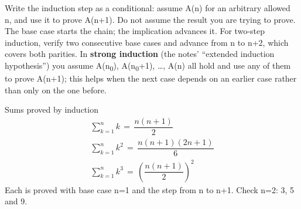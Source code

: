 \documentclass[11pt]{article}
\begin{document}
\begin{keepsection}
\begin{center}
\begin{minipage}[t]{0.950\linewidth}\centering
{}\par{}\end{minipage}
\end{center}

Write the induction step as a conditional: assume A(n) for an arbitrary allowed n, and use it to prove A(n+1). Do not assume the result you are trying to prove. The base case starts the chain; the implication advances it. For two-step induction, verify two consecutive base cases and advance from n to n+2, which covers both parities. In \textbf{strong induction} (the notes’ “extended induction hypothesis”) you assume A(n\textsubscript{0}), A(n\textsubscript{0}+1), …, A(n) all hold and use any of them to prove A(n+1); this helps when the next case depends on an earlier case rather than only on the one before.

\begin{equationcard}{Sums proved by induction}
\[ \begin{gathered} \sum_{{k}=1}^{{n}} {k}\, =\, \dfrac{{n}({n}+1)}{2} \\ \sum_{{k}=1}^{{n}} {k}^{2}\, =\, \dfrac{{n}({n}+1)(2{n}+1)}{6} \\ \sum_{{k}=1}^{{n}} {k}^{3}\, =\, \left(\dfrac{{n}({n}+1)}{2}\right)^{2} \end{gathered} \]
{\small Each is proved with base case n=1 and the step from n to n+1. Check n=2: 3, 5 and 9.}
\end{equationcard}


\end{keepsection}
\end{document}
